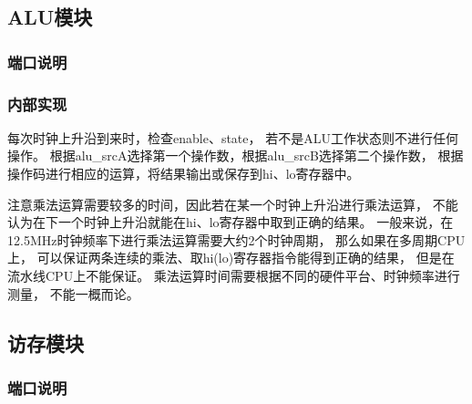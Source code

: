     \subsection{ALU模块}
        \subsubsection{端口说明}
            
        \subsubsection{内部实现}
            每次时钟上升沿到来时，检查enable、state，%
            若不是ALU工作状态则不进行任何操作。%
            根据alu\_srcA选择第一个操作数，根据alu\_srcB选择第二个操作数，%
            根据操作码进行相应的运算，将结果输出或保存到hi、lo寄存器中。

            注意乘法运算需要较多的时间，因此若在某一个时钟上升沿进行乘法运算，%
            不能认为在下一个时钟上升沿就能在hi、lo寄存器中取到正确的结果。%
            一般来说，在12.5MHz时钟频率下进行乘法运算需要大约2个时钟周期，%
            那么如果在多周期CPU上，%
            可以保证两条连续的乘法、取hi(lo)寄存器指令能得到正确的结果，%
            但是在流水线CPU上不能保证。%
            乘法运算时间需要根据不同的硬件平台、时钟频率进行测量，%
            不能一概而论。
    \subsection{访存模块}
        \subsubsection{端口说明}
            
